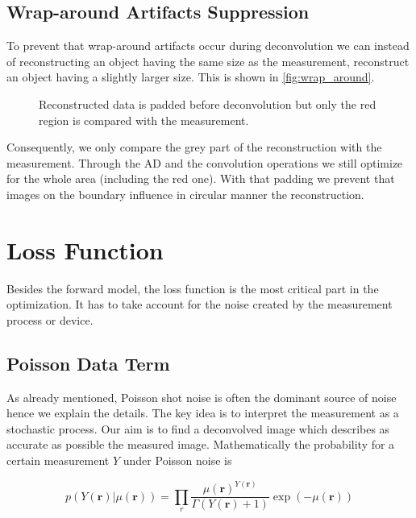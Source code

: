 \documentclass{juliacon}
\begin{document}
\subsection{Wrap-around Artifacts Suppression}
    To prevent that wrap-around artifacts occur during deconvolution we can instead
    of reconstructing an object having the same size as the measurement, reconstruct
    an object having a slightly larger size. This is shown in \autoref{fig:wrap_around}.
    \begin{figure}[h]
        \centering
        \caption{Reconstructed data is padded before deconvolution but only the red region is compared with the measurement.}
        \label{fig:wrap_around}
    \end{figure}
    Consequently, we only compare the grey part of the reconstruction with the measurement.
    Through the AD and the convolution operations we still optimize for the whole area (including the red one).
    With that padding we prevent that images on the boundary influence in circular manner the reconstruction.


\section{Loss Function}
    Besides the forward model, the loss function is the most critical part in the optimization.
    It has to take account for the noise created by the measurement process or device. 

\subsection{Poisson Data Term}
    As already mentioned, Poisson shot noise is often the dominant source of noise hence we 
    explain the details.
    The key idea is to interpret the measurement as a stochastic process. Our aim is to find a deconvolved image which describes as accurate as possible the measured image.
    Mathematically the probability for a certain measurement $Y$ under Poisson noise is


\begin{equation}
    p(Y(\mathbf r)|\mu(\mathbf r)) = \prod_r \frac{\mu(\mathbf r)^{Y(\mathbf r)}}{\Gamma(Y(\mathbf r) + 1)} \exp(- \mu(\mathbf r))
\end{equation}
\end{document}
